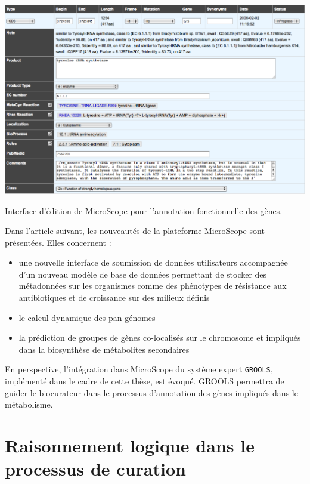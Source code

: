 \begin{refsegment}
    \begin{shadedfigure}[H]
        \centering
        \includegraphics[width=\textwidth]{img/curation_edit.png}
        \caption{Interface d'édition de MicroScope pour l'annotation fonctionnelle des gènes. }
        \label{fig:edit_microscope}
    \end{shadedfigure}

    Dans l'article suivant, les nouveautés de la plateforme MicroScope sont présentées. Elles concernent :
    \begin{itemize}
    	\item une nouvelle interface de soumission de données utilisateurs accompagnée d'un nouveau modèle de base de données permettant de stocker des métadonnées sur les organismes comme des phénotypes de résistance aux antibiotiques et de croissance sur des milieux définis 
    	\item le calcul dynamique des pan-génomes
    	\item la prédiction de groupes de gènes co-localisés sur le chromosome et impliqués dans la biosynthèse de métabolites secondaires
    \end{itemize}
	En perspective, l'intégration dans MicroScope du système expert \texttt{\gls{GROOLS}}, implémenté dans le cadre de cette thèse, est évoqué. GROOLS permettra de guider le biocurateur dans le processus d'annotation des gènes impliqués dans le métabolisme. 

    
    

    \section{Raisonnement logique dans le processus de curation}
    

\end{refsegment}
